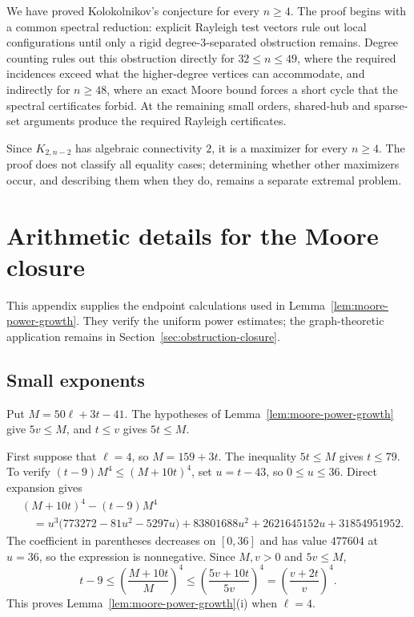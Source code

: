 \documentclass[11pt]{article}
\numberwithin{equation}{section}
\theoremstyle{definition}
\theoremstyle{remark}
\begin{document}
We have proved Kolokolnikov's conjecture for every \(n\ge4\).  The proof begins
with a common spectral reduction: explicit Rayleigh test vectors rule out
local configurations until only a rigid degree-\(3\)-separated obstruction
remains.  Degree counting rules out this obstruction directly for
\(32\le n\le49\), where the required incidences exceed what the higher-degree
vertices can accommodate, and indirectly for \(n\ge48\), where an exact Moore
bound forces a short cycle that the spectral certificates forbid.  At the
remaining small orders, shared-hub and sparse-set arguments produce the
required Rayleigh certificates.

Since \(K_{2,n-2}\) has algebraic connectivity \(2\), it is a maximizer
for every \(n\ge4\).  The proof does not classify all equality cases;
determining whether other maximizers occur, and describing them when they
do, remains a separate extremal problem.
\appendix

\section{Arithmetic details for the Moore closure}
\label{app:moore-arithmetic}

This appendix supplies the endpoint calculations used in
Lemma~\ref{lem:moore-power-growth}.  They verify the uniform power estimates;
the graph-theoretic application remains in Section~\ref{sec:obstruction-closure}.

\subsection{Small exponents}

Put \(M=50\ell+3t-41\).  The hypotheses of
Lemma~\ref{lem:moore-power-growth} give \(5v\le M\), and \(t\le v\) gives
\(5t\le M\).

First suppose that \(\ell=4\), so \(M=159+3t\).  The inequality
\(5t\le M\) gives \(t\le79\).  To verify
\((t-9)M^4\le(M+10t)^4\), set \(u=t-43\), so \(0\le u\le36\).  Direct
expansion gives
\begin{align*}
 &(M+10t)^4-(t-9)M^4\\
 &\quad={}
 u^3\bigl(773272-81u^2-5297u\bigr)
 +83801688u^2+2621645152u+31854951952.
\end{align*}
The coefficient in parentheses decreases on \([0,36]\) and has value
\(477604\) at \(u=36\), so the expression is nonnegative.  Since
\(M,v>0\) and \(5v\le M\),
\[
 t-9\le\left(\frac{M+10t}{M}\right)^4
 \le\left(\frac{5v+10t}{5v}\right)^4
 =\left(\frac{v+2t}{v}\right)^4.
\]
This proves Lemma~\ref{lem:moore-power-growth}\textup{(i)} when \(\ell=4\).
\end{document}
